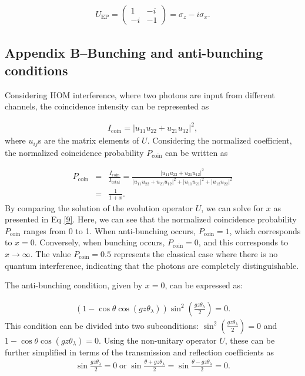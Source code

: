 \documentclass[%
reprint,
superscriptaddress,
amsthm,amsmath,amssymb,
aps,
]{revtex4-1}
\begin{document}
\begin{eqnarray}
	U_{\text{EP}}= \begin{pmatrix} 1 & -i \\	-i & -1 \end{pmatrix}= \sigma_{z}-i\sigma_{x}.
\end{eqnarray}


\subsection*{\label{sec:leveled2}Appendix B--Bunching and anti-bunching conditions}

Considering HOM interference, where two photons are input from different channels, the coincidence intensity can be represented as

\begin{eqnarray}
	I_{\text{coin}}=\left| u_{11} u_{22} + u_{21} u_{12} \right|^2,
\end{eqnarray}
where $ u_{ij} $s are the matrix elements of $U$. Considering the normalized coefficient, the normalized coincidence probability $P_{\text{coin}} $ can be written as

\begin{eqnarray}
	P_{\text{coin}}&=&\frac{I_{\text{coin}}}{I_{\text{total}}}=\frac{\left| u_{11} u_{22} + u_{21} u_{12} \right|^2}{
		\left| u_{11} u_{22} + u_{21} u_{12} \right|^2
		+ \left| u_{11} u_{21} \right|^2
		+ \left| u_{12} u_{22} \right|^2}\nonumber\\
	&=&\frac{1}{1+x}.
\end{eqnarray}
By comparing the solution of the evolution operator $U$, we can solve for $x$ as presented in Eq \ref{9}. Here, we can see that the normalized coincidence probability $P_{\text{coin}}$ ranges from 0 to 1. When anti-bunching occurs, $P_{\text{coin}}=1$, which corresponds to $x=0$. Conversely, when bunching occurs, $P_{\text{coin}}=0$, and this corresponds to $x\rightarrow\infty$. The value $P_{\text{coin}}=0.5$ represents the classical case where there is no quantum interference, indicating that the photons are completely distinguishable.

The anti-bunching condition, given by $x=0$, can be expressed as:

\begin{eqnarray}
	\left( 1 - \cos \theta \cos(gz \theta_{\lambda}) \right) \sin^2 \left( \frac{gz \theta_{\lambda}}{2}\right)=0.
\end{eqnarray}
This condition can be divided into two subconditions: $\sin^2 \left( \frac{gz \theta_{\lambda}}{2} \right) = 0$ and $1 - \cos \theta \cos(gz \theta_{\lambda}) = 0$. Using the non-unitary operator $U$, these can be further simplified in terms of the transmission and reflection coefficients as
\begin{eqnarray}
	\sin \frac{gz\theta_{\lambda }}{2}=0 \; \text{or} \; \sin \frac{\theta+gz\theta_{\lambda}}{2}=\sin \frac{\theta-gz\theta_{\lambda}}{2}=0\label{} .
\end{eqnarray}
\end{document}
